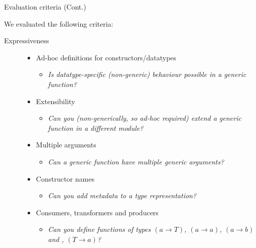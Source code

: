 \documentclass[10pt]{beamer}
\begin{document}
\begin{frame}{Evaluation criteria (Cont.)}
	
	We evaluated the following criteria:
\begin{description}
\item[Expressiveness]
\begin{itemize}
\item Ad-hoc definitions for constructors/datatypes	
\begin{itemize}
\item \textit{Is datatype-specific (non-generic) behaviour possible in a generic function?}
\end{itemize}
\item Extensibility
\begin{itemize}
\item \textit{Can you (non-generically, so ad-hoc required) extend a generic function in a different module?}
\end{itemize}
\item Multiple arguments
\begin{itemize}
\item \textit{Can a generic function have multiple generic arguments?}
\end{itemize}
\item Constructor names
\begin{itemize}
\item \textit{Can you add metadata to a type representation?}
\end{itemize}
\item Consumers, transformers and producers
\begin{itemize}
\item \textit{Can you define functions of types $ (a \rightarrow T) $, $ ( a \rightarrow a ) $, $ ( a \rightarrow b ) $ and , $ ( T \rightarrow a ) $?}
\end{itemize}
\end{itemize}
\end{description}
\end{frame}
\end{document}
